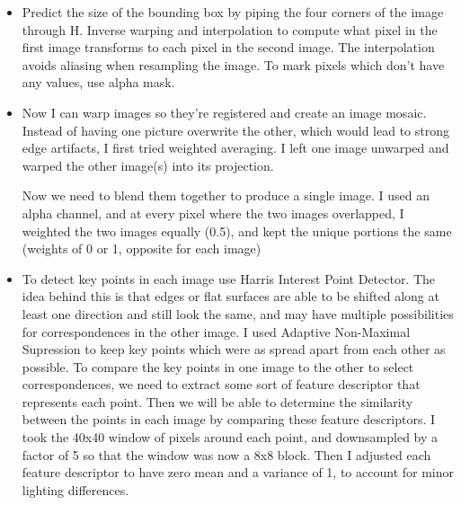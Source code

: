 \documentclass[3pt,landscape]{article}
\begin{document}
\begin{multicols}{3}
\begin{center}
\end{center}
\begin{itemize}
\item Predict the size of the bounding box by piping the four corners of the image through H. Inverse warping and interpolation to compute what pixel in the first image transforms to each pixel in the second image. The interpolation avoids aliasing when resampling the image. To mark pixels which don't have any values, use alpha mask.
\item Now I can warp images so they're registered and create an image mosaic. Instead of having one picture overwrite the other, which would lead to strong edge artifacts, I first tried weighted averaging. I left one image unwarped and warped the other image(s) into its projection.

Now we need to blend them together to produce a single image. I used an alpha channel, and at every pixel where the two images overlapped, I weighted the two images equally (0.5), and kept the unique portions the same (weights of 0 or 1, opposite for each image)
\item To detect key points in each image use Harris Interest Point Detector. The idea behind this is that edges or flat surfaces are able to be shifted along at least one direction and still look the same, and may have multiple possibilities for correspondences in the other image. I used Adaptive Non-Maximal Supression to keep key points which were as spread apart from each other as possible. To compare the key points in one image to the other to select correspondences, we need to extract some sort of feature descriptor that represents each point. Then we will be able to determine the similarity between the points in each image by comparing these feature descriptors. I took the 40x40 window of pixels around each point, and downsampled by a factor of 5 so that the window was now a 8x8 block. Then I adjusted each feature descriptor to have zero mean and a variance of 1, to account for minor lighting differences.


\end{itemize}


\scriptsize

\end{multicols}
\end{document}
